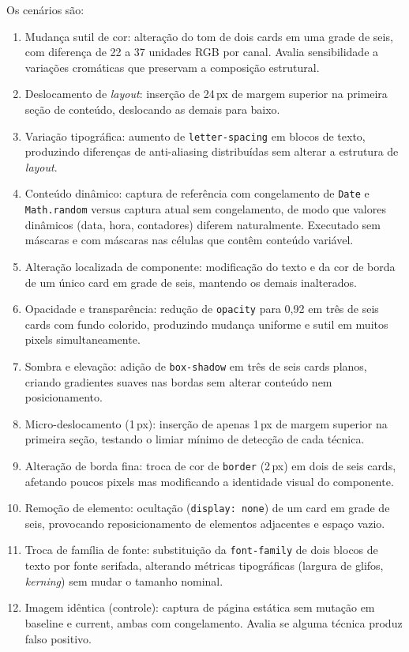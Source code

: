 \documentclass{UNESC}
\begin{document}
Os cenários são:
\begin{enumerate}[label=\alph*),leftmargin=1.5em]
  \item Mudança sutil de cor: alteração do tom de dois cards em uma grade de seis, com diferença de 22 a 37 unidades RGB por canal. Avalia sensibilidade a variações cromáticas que preservam a composição estrutural.
  \item Deslocamento de \emph{layout}: inserção de 24\,px de margem superior na primeira seção de conteúdo, deslocando as demais para baixo.
  \item Variação tipográfica: aumento de \texttt{letter-spacing} em blocos de texto, produzindo diferenças de anti-aliasing distribuídas sem alterar a estrutura de \emph{layout}.
  \item Conteúdo dinâmico: captura de referência com congelamento de \texttt{Date} e \texttt{Math.random} versus captura atual sem congelamento, de modo que valores dinâmicos (data, hora, contadores) diferem naturalmente. Executado sem máscaras e com máscaras nas células que contêm conteúdo variável.
  \item Alteração localizada de componente: modificação do texto e da cor de borda de um único card em grade de seis, mantendo os demais inalterados.
  \item Opacidade e transparência: redução de \texttt{opacity} para 0,92 em três de seis cards com fundo colorido, produzindo mudança uniforme e sutil em muitos pixels simultaneamente.
  \item Sombra e elevação: adição de \texttt{box-shadow} em três de seis cards planos, criando gradientes suaves nas bordas sem alterar conteúdo nem posicionamento.
  \item Micro-deslocamento (1\,px): inserção de apenas 1\,px de margem superior na primeira seção, testando o limiar mínimo de detecção de cada técnica.
  \item Alteração de borda fina: troca de cor de \texttt{border} (2\,px) em dois de seis cards, afetando poucos pixels mas modificando a identidade visual do componente.
  \item Remoção de elemento: ocultação (\texttt{display: none}) de um card em grade de seis, provocando reposicionamento de elementos adjacentes e espaço vazio.
  \item Troca de família de fonte: substituição da \texttt{font-family} de dois blocos de texto por fonte serifada, alterando métricas tipográficas (largura de glifos, \emph{kerning}) sem mudar o tamanho nominal.
  \item Imagem idêntica (controle): captura de página estática sem mutação em baseline e current, ambas com congelamento. Avalia se alguma técnica produz falso positivo.
\end{enumerate}
\end{document}
